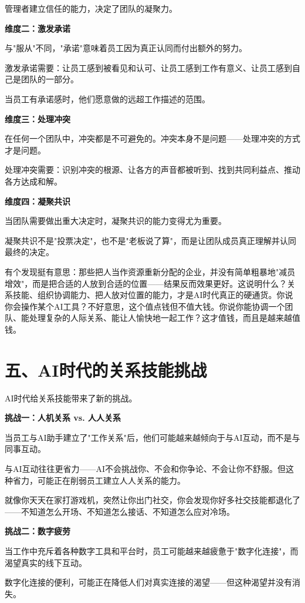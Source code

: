 管理者建立信任的能力，决定了团队的凝聚力。

\textbf{维度二：激发承诺}

与"服从"不同，"承诺"意味着员工因为真正认同而付出额外的努力。

激发承诺需要：让员工感到被看见和认可、让员工感到工作有意义、让员工感到自己是团队的一部分。

当员工有承诺感时，他们愿意做的远超工作描述的范围。

\textbf{维度三：处理冲突}

在任何一个团队中，冲突都是不可避免的。冲突本身不是问题——处理冲突的方式才是问题。

处理冲突需要：识别冲突的根源、让各方的声音都被听到、找到共同利益点、推动各方达成和解。

\textbf{维度四：凝聚共识}

当团队需要做出重大决定时，凝聚共识的能力变得尤为重要。

凝聚共识不是"投票决定"，也不是"老板说了算"，而是让团队成员真正理解并认同最终的决定。

有个发现挺有意思：那些把人当作资源重新分配的企业，并没有简单粗暴地"减员增效"，而是把合适的人放到合适的位置——结果反而效果更好。这说明什么？关系技能、组织协调能力、把人放对位置的能力，才是AI时代真正的硬通货。你说你会操作某个AI工具？不好意思，这个值点钱但不值大钱。你说你能协调一个团队、能处理复杂的人际关系、能让人愉快地一起工作？这才值钱，而且是越来越值钱。

\section{五、AI时代的关系技能挑战}


AI时代给关系技能带来了新的挑战。

\textbf{挑战一：人机关系 vs. 人人关系}

当员工与AI助手建立了"工作关系"后，他们可能越来越倾向于与AI互动，而不是与同事互动。

与AI互动往往更省力——AI不会挑战你、不会和你争论、不会让你不舒服。但这种省力，可能正在削弱员工建立人人关系的能力。

就像你天天在家打游戏机，突然让你出门社交，你会发现你好多社交技能都退化了——不知道怎么开场、不知道怎么接话、不知道怎么应对冷场。

\textbf{挑战二：数字疲劳}

当工作中充斥着各种数字工具和平台时，员工可能越来越疲惫于"数字化连接"，而渴望真实的线下互动。

数字化连接的便利，可能正在降低人们对真实连接的渴望——但这种渴望并没有消失。

